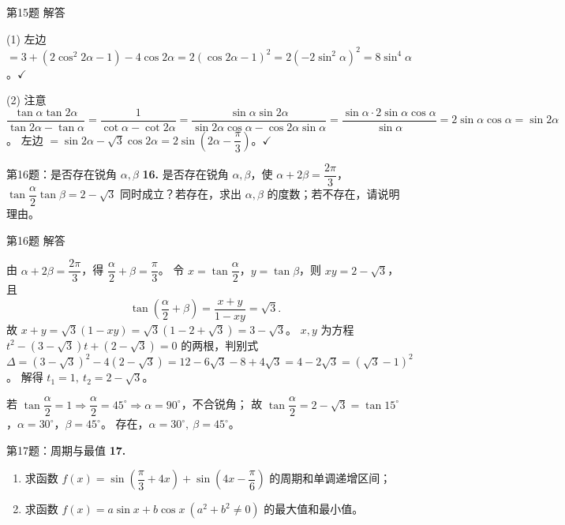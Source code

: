 \documentclass[10pt,aspectratio=169,serif]{beamer}
\begin{document}
\begin{frame}[t]{第15题 解答}
\begin{tcolorbox}[colback=orange!10,colframe=orange,title=\textbf{证明}]
(1) 左边 $=3+(2\cos^2 2\alpha-1)-4\cos 2\alpha=2(\cos 2\alpha-1)^2=2(-2\sin^2\alpha)^2=8\sin^4\alpha$。$\checkmark$

(2) 注意 $\dfrac{\tan\alpha\tan 2\alpha}{\tan 2\alpha-\tan\alpha}=\dfrac{1}{\cot\alpha-\cot 2\alpha}=\dfrac{\sin\alpha\sin 2\alpha}{\sin 2\alpha\cos\alpha-\cos 2\alpha\sin\alpha}=\dfrac{\sin\alpha\cdot 2\sin\alpha\cos\alpha}{\sin\alpha}=2\sin\alpha\cos\alpha=\sin 2\alpha$。
左边 $=\sin 2\alpha-\sqrt3\cos 2\alpha=2\sin\!\left(2\alpha-\dfrac{\pi}{3}\right)$。$\checkmark$
\end{tcolorbox}
\end{frame}

\begin{frame}[t]{第16题：是否存在锐角 $\alpha,\beta$}
\textbf{16.} 是否存在锐角 $\alpha,\beta$，使 $\alpha+2\beta=\dfrac{2\pi}{3}$，$\tan\dfrac{\alpha}{2}\tan\beta=2-\sqrt3$ 同时成立？若存在，求出 $\alpha,\beta$ 的度数；若不存在，请说明理由。
\end{frame}

\begin{frame}[t]{第16题 解答}
\begin{tcolorbox}[colback=orange!10,colframe=orange,title=\textbf{解}]
由 $\alpha+2\beta=\dfrac{2\pi}{3}$，得 $\dfrac{\alpha}{2}+\beta=\dfrac{\pi}{3}$。
令 $x=\tan\dfrac{\alpha}{2}$，$y=\tan\beta$，则 $xy=2-\sqrt3$，且
\[
\tan\!\left(\frac{\alpha}{2}+\beta\right)=\frac{x+y}{1-xy}=\sqrt3.
\]
故 $x+y=\sqrt3(1-xy)=\sqrt3(1-2+\sqrt3)=3-\sqrt3$。
$x,y$ 为方程 $t^2-(3-\sqrt3)t+(2-\sqrt3)=0$ 的两根，判别式 $\Delta=(3-\sqrt3)^2-4(2-\sqrt3)=12-6\sqrt3-8+4\sqrt3=4-2\sqrt3=(\sqrt3-1)^2$。
解得 $t_1=1,\ t_2=2-\sqrt3$。

若 $\tan\dfrac{\alpha}{2}=1\Rightarrow\dfrac{\alpha}{2}=45^\circ\Rightarrow\alpha=90^\circ$，不合锐角；
故 $\tan\dfrac{\alpha}{2}=2-\sqrt3=\tan15^\circ$，$\alpha=30^\circ$，$\beta=45^\circ$。
\alert{存在，$\alpha=30^\circ,\ \beta=45^\circ$}。
\end{tcolorbox}
\end{frame}

\begin{frame}[t]{第17题：周期与最值}
\textbf{17.}
\begin{enumerate}
  \item 求函数 $f(x)=\sin\!\left(\dfrac{\pi}{3}+4x\right)+\sin\!\left(4x-\dfrac{\pi}{6}\right)$ 的周期和单调递增区间；
  \item 求函数 $f(x)=a\sin x+b\cos x\ (a^2+b^2\neq 0)$ 的最大值和最小值。
\end{enumerate}
\end{frame}
\end{document}
